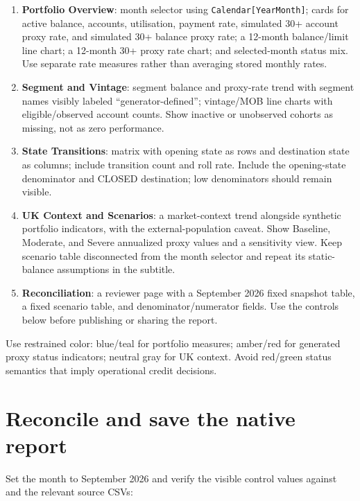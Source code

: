\documentclass[11pt]{article}
\begin{document}
\begin{enumerate}
\item \textbf{Portfolio Overview}: month selector using \texttt{Calendar[YearMonth]}; cards for active balance, accounts, utilisation, payment rate, simulated 30+ account proxy rate, and simulated 30+ balance proxy rate; a 12-month balance/limit line chart; a 12-month 30+ proxy rate chart; and selected-month status mix. Use separate rate measures rather than averaging stored monthly rates.
\item \textbf{Segment and Vintage}: segment balance and proxy-rate trend with segment names visibly labeled “generator-defined”; vintage/MOB line charts with eligible/observed account counts. Show inactive or unobserved cohorts as missing, not as zero performance.
\item \textbf{State Transitions}: matrix with opening state as rows and destination state as columns; include transition count and roll rate. Include the opening-state denominator and CLOSED destination; low denominators should remain visible.
\item \textbf{UK Context and Scenarios}: a market-context trend alongside synthetic portfolio indicators, with the external-population caveat. Show Baseline, Moderate, and Severe annualized proxy values and a sensitivity view. Keep scenario table disconnected from the month selector and repeat its static-balance assumptions in the subtitle.
\item \textbf{Reconciliation}: a reviewer page with a September 2026 fixed snapshot table, a fixed scenario table, and denominator/numerator fields. Use the controls below before publishing or sharing the report.
\end{enumerate}

Use restrained color: blue/teal for portfolio measures; amber/red for generated proxy status indicators; neutral gray for UK context. Avoid red/green status semantics that imply operational credit decisions.

\section{Reconcile and save the native report}

Set the month to September 2026 and verify the visible control values against  and the relevant source CSVs:
\end{document}
